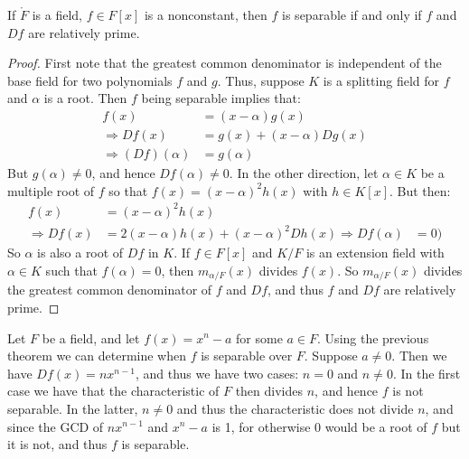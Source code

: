 \documentclass{article}                                                        %
\begin{document}
            \begin{theorem}
                If $\ring{F}$ is a field, $f\in{F}[x]$ is a nonconstant, then
                $f$ is separable if and only if $f$ and $Df$ are relatively
                prime.
            \end{theorem}
            \begin{proof}
                First note that the greatest common denominator is independent
                of the base field for two polynomials $f$ and $g$. Thus, suppose
                $K$ is a splitting field for $f$ and $\alpha$ is a root. Then
                $f$ being separable implies that:
                \begin{align}
                    f(x)&=(x-\alpha)g(x)\\
                    \Rightarrow{Df}(x)&=g(x)+(x-\alpha)Dg(x)\\
                    \Rightarrow(Df)(\alpha)&=g(\alpha)
                \end{align}
                But $g(\alpha)\ne{0}$, and hence $Df(\alpha)\ne{0}$. In the
                other direction, let $\alpha\in{K}$ be a multiple root of $f$ so
                that $f(x)=(x-\alpha)^{2}h(x)$ with $h\in{K}[x]$. But then:
                \begin{align}
                    f(x)&=(x-\alpha)^{2}h(x)\\
                    \Rightarrow{Df}(x)&=2(x-\alpha)h(x)+(x-\alpha)^{2}Dh(x)
                    \Rightarrow{Df}(\alpha)&=0)
                \end{align}
                So $\alpha$ is also a root of $Df$ in $K$.
                If $f\in{F}[x]$ and $K/F$ is an extension field with
                $\alpha\in{K}$ such that $f(\alpha)=0$, then $m_{\alpha/F}(x)$
                divides $f(x)$. So $m_{\alpha/F}(x)$ divides the greatest
                common denominator of $f$ and $Df$, and thus $f$ and $Df$ are
                relatively prime.
            \end{proof}
            \begin{example}
                Let $F$ be a field, and let $f(x)=x^{n}-a$ for some $a\in{F}$.
                Using the previous theorem we can determine when $f$ is
                separable over $F$. Suppose $a\ne{0}$. Then we have
                $Df(x)=nx^{n-1}$, and thus we have two cases: $n=0$ and
                $n\ne{0}$. In the first case we have that the characteristic of
                $F$ then divides $n$, and hence $f$ is not separable. In the
                latter, $n\ne{0}$ and thus the characteristic does not divide
                $n$, and since the GCD of $nx^{n-1}$ and $x^{n}-a$ is 1,
                for otherwise $0$ would be a root of $f$ but it is not, and thus
                $f$ is separable.
            \end{example}
\end{document}
